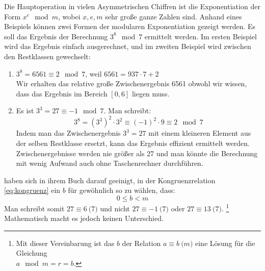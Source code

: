 \begin{example}
  Die Hauptoperation in vielen Asymmetrischen Chiffren ist die Exponentiation der Form
  $x^e \mod{m}$, wobei $x,e,m$ sehr große ganze Zahlen sind. Anhand eines Beispiels können
  zwei Formen der modularen Exponentiation gezeigt werden. Es soll das Ergebnis der
  Berechnung $3^8 \mod{7}$ ermittelt werden. Im ersten Beispiel wird das Ergebnis einfach
  ausgerechnet, und im zweiten Beispiel wird zwischen den Restklassen gewechselt:
  \begin{enumerate}[itemsep = 0pt]
    \item $3^8 = 6561 \equiv 2 \mod{7}$, weil $6561 = 937 \cdot 7 + 2$ \\
          Wir erhalten das relative große Zwischenergebnis 6561 obwohl wir wissen,
          dass das Ergebnis im Bereich $[0, 6]$ liegen muss.

    \item Es ist $3^3 = 27 \equiv -1 \mod{7}$. Man schreibt:
          \begin{equation*}
            3^8 = (3^3)^2 \cdot 3^2 \equiv (-1)^2 \cdot 9 \equiv 2 \mod{7}
          \end{equation*}
          Indem man das Zwischenergebnis $3^3 = 27$ mit einem kleineren Element aus der selben
          Restklasse ersetzt, kann das Ergebnis effizient ermittelt werden. Zwischenergebnisse
          werden nie größer als 27 und man könnte die Berechnung mit wenig Aufwand auch ohne
          Taschenrechner durchführen.
  \end{enumerate}
\end{example}

\begin{remark}
  \citeauthor{BOOK:crypto} \parencite*[16]{BOOK:crypto} haben sich in ihrem Buch darauf geeinigt,
  in der Kongruenzrelation \eqref{eq:kongruenz} ein $b$ für gewöhnlich
  so zu wählen, dass:
  \begin{equation*}
    0 \leq b < m
  \end{equation*}
  Man schreibt somit $27 \equiv 6 \pod{7}$ und nicht $27 \equiv -1 \pod{7}$
  oder $27 \equiv 13 \pod{7}$. \footnote{Mit dieser Vereinbarung ist das $b$ der Relation
    $a \equiv b \pod{m}$ eine Lösung für die Gleichung \\ $a \mod{m} = r = b$.}
  Mathematisch macht es jedoch keinen Unterschied.
\end{remark}

